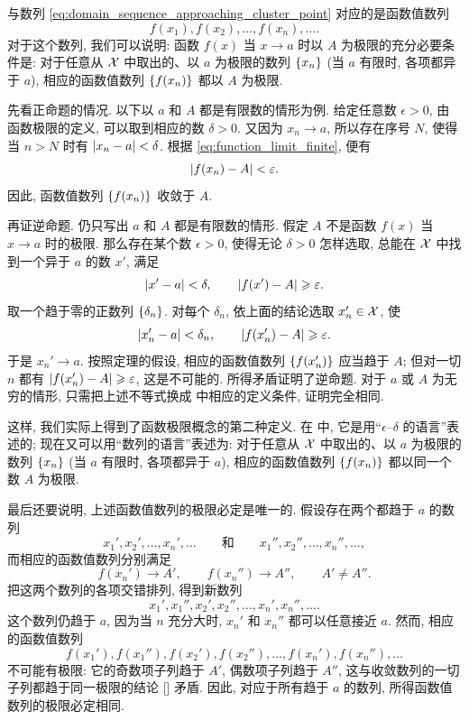 与数列 \eqref{eq:domain_sequence_approaching_cluster_point} 对应的是函数值数列
\begin{equation}\label{eq:function_value_sequence}
f(x_1),f(x_2),\ldots,f(x_n),\ldots.
\end{equation}
对于这个数列, 我们可以说明:
{\kaishu
函数 $f(x)$ 当 $x\to a$ 时以 $A$ 为极限的充分必要条件是:
对于任意从 $\mathcal{X}$ 中取出的、以 $a$ 为极限的数列 $\{x_{n}\}$
(当 $a$ 有限时, 各项都异于 $a$),
相应的函数值数列 $\left\{ f(x_n) \right\}$ 都以 $A$ 为极限.}

先看正命题的情况.
以下以 $a$ 和 $A$ 都是有限数的情形为例.
给定任意数 $\epsilon>0$, 由函数极限的定义,
可以取到相应的数 $\delta>0$.
又因为 $x_n\to a$, 所以存在序号 $N$,
使得当 $n>N$ 时有 $\left| x_n-a \right|<\delta$.
根据 \eqref{eq:function_limit_finite}, 便有
$$
\left| f(x_n)-A \right|<\varepsilon.
$$
因此, 函数值数列 $\left\{ f(x_n) \right\}$ 收敛于 $A$.

再证逆命题. 仍只写出 $a$ 和 $A$ 都是有限数的情形.
假定 $A$ 不是函数 $f(x)$ 当 $x\to a$ 时的极限.
那么存在某个数 $\epsilon>0$, 使得无论 $\delta>0$ 怎样选取,
总能在 $\mathcal{X}$ 中找到一个异于 $a$ 的数 $x'$, 满足
$$
\left| x'-a \right|<\delta,
\qquad
\left| f(x')-A \right|\geqslant\varepsilon.
$$
取一个趋于零的正数列 $\{\delta_{n}\}$.
对每个 $\delta_n$, 依上面的结论选取 $x_n'\in\mathcal{X}$, 使
$$
\left| x_n'-a \right|<\delta_n,
\qquad
\left| f(x_n')-A \right|\geqslant\varepsilon.
$$
于是 $x_n'\to a$.
按照定理的假设, 相应的函数值数列 $\left\{ f(x_n') \right\}$ 应当趋于 $A$;
但对一切 $n$ 都有 $\left| f(x_n')-A \right|\geqslant\varepsilon$, 这是不可能的.
所得矛盾证明了逆命题.
对于 $a$ 或 $A$ 为无穷的情形, 只需把上述不等式换成
 中相应的定义条件, 证明完全相同.

这样, 我们实际上得到了函数极限概念的第二种定义.
在  中, 它是用“$\epsilon$--$\delta$ 的语言”表述的;
现在又可以用“数列的语言”表述为:
对于任意从 $\mathcal{X}$ 中取出的、以 $a$ 为极限的数列 $\{x_{n}\}$
(当 $a$ 有限时, 各项都异于 $a$),
相应的函数值数列 $\left\{ f(x_n) \right\}$ 都以同一个数 $A$ 为极限.

最后还要说明, 上述函数值数列的极限必定是唯一的.
假设存在两个都趋于 $a$ 的数列
$$
x_1',x_2',\ldots,x_n',\ldots
\qquad\text{和}\qquad
x_1'',x_2'',\ldots,x_n'',\ldots,
$$
而相应的函数值数列分别满足
$$
f(x_n')\to A',
\qquad
f(x_n'')\to A'',
\qquad
A'\ne A''.
$$
把这两个数列的各项交错排列, 得到新数列
$$
x_1',x_1'',x_2',x_2'',\ldots,x_n',x_n'',\ldots.
$$
这个数列仍趋于 $a$, 因为当 $n$ 充分大时,
$x_n'$ 和 $x_n''$ 都可以任意接近 $a$.
然而, 相应的函数值数列
$$
f(x_1'),f(x_1''),f(x_2'),f(x_2''),\ldots,f(x_n'),f(x_n''),\ldots
$$
不可能有极限:
它的奇数项子列趋于 $A'$, 偶数项子列趋于 $A''$,
这与收敛数列的一切子列都趋于同一极限的结论 [] 矛盾.
因此, 对应于所有趋于 $a$ 的数列, 所得函数值数列的极限必定相同.

